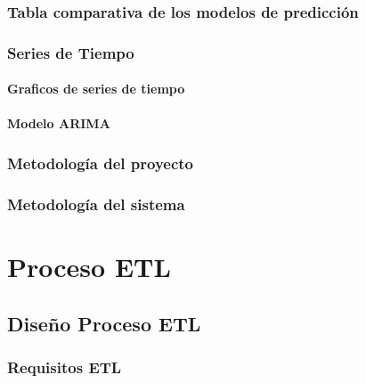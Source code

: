 \documentclass[letterpaper, 12pt]{report}
\begin{document}
\subsection{Tabla comparativa de los modelos de predicción}


\subsection{Series de Tiempo}
\subsubsection{Graficos de series de tiempo}

\subsubsection{Modelo ARIMA}


\subsection{Metodología del proyecto}


\subsection{Metodología del sistema}


\chapter{Proceso ETL}


\section{Diseño Proceso ETL}


\subsection{Requisitos ETL}

\end{document}

